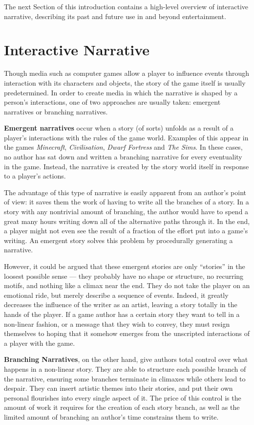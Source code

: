 \documentclass[11pt]{report}
\begin{document}
The next Section of this introduction contains a high-level overview of
interactive narrative, describing its past and future use in and beyond entertainment.

\section{Interactive Narrative}
\label{sec:interactive-narrative}
Though media such as computer games allow a player to influence events through
interaction with its characters and objects, the story of the game itself is
usually predetermined. In order to create media in which the narrative is shaped
by a person's interactions, one of two approaches are usually taken: emergent narratives or branching narratives.

\textbf{Emergent narratives} occur when a story (of sorts) unfolds as a result of a player's interactions with the rules of the game world. Examples of this appear in the games \emph{Minecraft}, \emph{Civilisation}, \emph{Dwarf Fortress} and \emph{The Sims}. In these cases, no author has sat down and written a branching narrative for every eventuality in the game. Instead, the narrative is created by the story world itself in response to a player's actions.

The advantage of this type of narrative is easily apparent from an author's point of view: it saves them the work of having to write all the branches of a story. In a story with any nontrivial amount of branching, the author would have to spend a great many hours writing down all of the alternative paths through it. In the end, a player might not even see the result of a fraction of the effort put into a game's writing. An emergent story solves this problem by procedurally generating a narrative.

However, it could be argued that these emergent stories are only ``stories'' in
the loosest possible sense --- they probably have no shape or structure, no recurring motifs, and nothing like a climax near the end. They do not take the player on an emotional ride, but merely describe a sequence of events. Indeed, it greatly decreases the influence of the writer as an artist, leaving a story totally in the hands of the player. If a game author has a certain story they want to tell in a non-linear fashion, or a message that they wish to convey, they must resign themselves to hoping that it somehow emerges from the unscripted interactions of a player with the game.

\textbf{Branching Narratives}, on the other hand, give authors total control over what happens in a non-linear story. They are able to structure each possible branch of the narrative, ensuring some branches terminate in climaxes while others lead to despair. They can insert artistic themes into their stories, and put their own personal flourishes into every single aspect of it. The price of this control is the amount of work it requires for the creation of each story branch, as well as the limited amount of branching an author's time constrains them to write.
\end{document}
